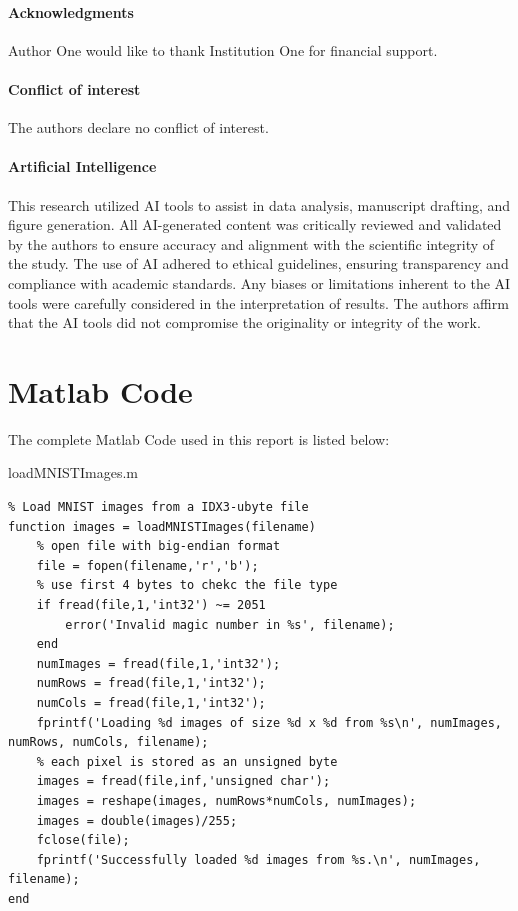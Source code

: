 \documentclass[fleqn]{rbfin}
\begin{document}
\paragraph{Acknowledgments}
Author One would like to thank Institution One for financial support.

\paragraph{Conflict of interest} The authors declare no conflict of interest.

\paragraph{Artificial Intelligence} This research utilized AI tools to assist in data analysis, manuscript drafting, and figure generation. All AI-generated content was critically reviewed and validated by the authors to ensure accuracy and alignment with the scientific integrity of the study. The use of AI adhered to ethical guidelines, ensuring transparency and compliance with academic standards. Any biases or limitations inherent to the AI tools were carefully considered in the interpretation of results. The authors affirm that the AI tools did not compromise the originality or integrity of the work.

\label{refs}




\rbfinappendix
\section{Matlab Code}

The complete Matlab Code used in this report is listed below: 

loadMNISTImages.m
\begin{lstlisting}
% Load MNIST images from a IDX3-ubyte file
function images = loadMNISTImages(filename)
    % open file with big-endian format
    file = fopen(filename,'r','b');
    % use first 4 bytes to chekc the file type
    if fread(file,1,'int32') ~= 2051
        error('Invalid magic number in %s', filename);
    end
    numImages = fread(file,1,'int32');
    numRows = fread(file,1,'int32');
    numCols = fread(file,1,'int32');
    fprintf('Loading %d images of size %d x %d from %s\n', numImages, numRows, numCols, filename);
    % each pixel is stored as an unsigned byte
    images = fread(file,inf,'unsigned char');
    images = reshape(images, numRows*numCols, numImages);
    images = double(images)/255;
    fclose(file);
    fprintf('Successfully loaded %d images from %s.\n', numImages, filename);
end
\end{lstlisting}
\end{document}
